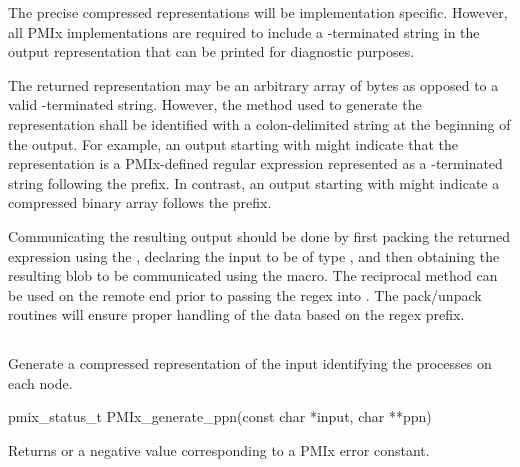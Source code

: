 The precise compressed representations will be implementation specific. However, all \ac{PMIx} implementations are required to include a -terminated string in the output representation that can be printed for diagnostic purposes.

\advicermstart
The returned representation may be an arbitrary array of bytes as opposed to a valid -terminated string. However, the method used to generate the representation shall be identified with a colon-delimited string at the beginning of the output. For example, an output starting with  might indicate that the representation is a \ac{PMIx}-defined regular expression represented as a -terminated string following the  prefix. In contrast, an output starting with  might indicate a compressed binary array follows the prefix.

Communicating the resulting output should be done by first packing the returned expression using the , declaring the input to be of type , and then obtaining the resulting blob to be communicated using the  macro. The reciprocal method can be used on the remote end prior to passing the regex into . The pack/unpack routines will ensure proper handling of the data based on the regex prefix.
\advicermend


\subsection{}

\summary

Generate a compressed representation of the input identifying the processes on each node.

\format

\cspecificstart
\begin{codepar}
pmix_status_t PMIx_generate_ppn(const char *input, char **ppn)
\end{codepar}
\cspecificend

\begin{arglist}
\end{arglist}

Returns  or a negative value corresponding to a PMIx error constant.

